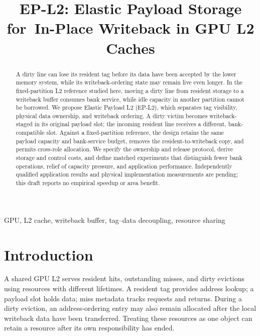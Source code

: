 \documentclass[conference,letterpaper]{IEEEtran}
\begin{document}
\title{EP-L2: Elastic Payload Storage for\ In-Place Writeback in GPU L2 Caches}
\author{
}
\maketitle

\begin{abstract}
A dirty line can lose its resident tag before its data have been accepted by the lower memory system, while its writeback-ordering state may remain live even longer. In the fixed-partition L2 reference studied here, moving a dirty line from resident storage to a writeback buffer consumes bank service, while idle capacity in another partition cannot be borrowed. We propose Elastic Payload L2 (EP-L2), which separates tag visibility, physical data ownership, and writeback ordering. A dirty victim becomes writeback-staged in its original payload slot; the incoming resident line receives a different, bank-compatible slot. Against a fixed-partition reference, the design retains the same payload capacity and bank-service budget, removes the resident-to-writeback copy, and permits cross-role allocation. We specify the ownership and release protocol, derive storage and control costs, and define matched experiments that distinguish fewer bank operations, relief of capacity pressure, and application performance. Independently qualified application results and physical implementation measurements are pending; this draft reports no empirical speedup or area benefit.
\end{abstract}
\begin{IEEEkeywords}
GPU, L2 cache, writeback buffer, tag--data decoupling, resource sharing
\end{IEEEkeywords}

\section{Introduction}
A shared GPU L2 serves resident hits, outstanding misses, and dirty evictions using resources with different lifetimes. A resident tag provides address lookup; a payload slot holds data; miss metadata tracks requests and returns. During a dirty eviction, an address-ordering entry may also remain allocated after the local writeback data have been transferred. Treating these resources as one object can retain a resource after its own responsibility has ended.
\end{document}
